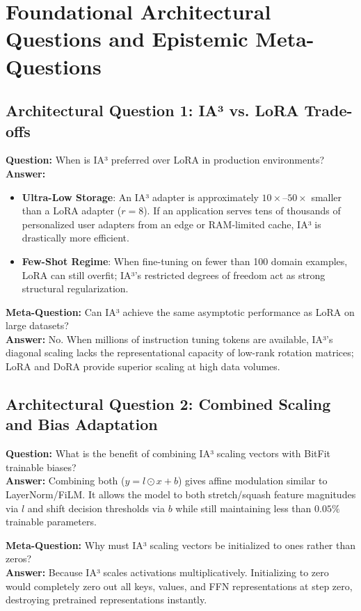 \documentclass[11pt,a4paper]{article}
\theoremstyle{definition}
\begin{document}
\section{Foundational Architectural Questions and Epistemic Meta-Questions}

\subsection{Architectural Question 1: IA³ vs. LoRA Trade-offs}
\textbf{Question:} When is IA³ preferred over LoRA in production environments?\\
\textbf{Answer:} 
\begin{itemize}
    \item \textbf{Ultra-Low Storage}: An IA³ adapter is approximately $10\times\text{--}50\times$ smaller than a LoRA adapter ($r=8$). If an application serves tens of thousands of personalized user adapters from an edge or RAM-limited cache, IA³ is drastically more efficient.
    \item \textbf{Few-Shot Regime}: When fine-tuning on fewer than 100 domain examples, LoRA can still overfit; IA³'s restricted degrees of freedom act as strong structural regularization.
\end{itemize}

\textbf{Meta-Question:} Can IA³ achieve the same asymptotic performance as LoRA on large datasets?\\
\textbf{Answer:} No. When millions of instruction tuning tokens are available, IA³'s diagonal scaling lacks the representational capacity of low-rank rotation matrices; LoRA and DoRA provide superior scaling at high data volumes.

\subsection{Architectural Question 2: Combined Scaling and Bias Adaptation}
\textbf{Question:} What is the benefit of combining IA³ scaling vectors with BitFit trainable biases?\\
\textbf{Answer:} Combining both ($y = l \odot x + b$) gives affine modulation similar to LayerNorm/FiLM. It allows the model to both stretch/squash feature magnitudes via $l$ and shift decision thresholds via $b$ while still maintaining less than $0.05\%$ trainable parameters.

\textbf{Meta-Question:} Why must IA³ scaling vectors be initialized to ones rather than zeros?\\
\textbf{Answer:} Because IA³ scales activations multiplicatively. Initializing to zero would completely zero out all keys, values, and FFN representations at step zero, destroying pretrained representations instantly.
\end{document}
